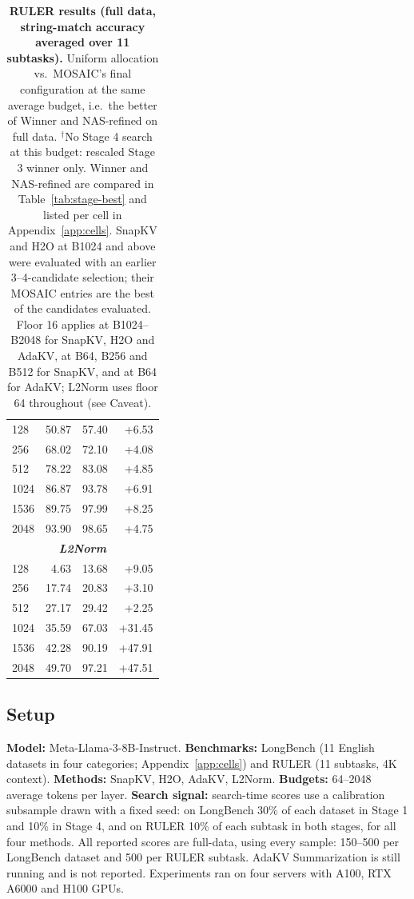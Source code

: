 \documentclass[11pt]{article}
\begin{document}
\begin{table}[t]
\begin{tabular}{@{} l r r r @{}}
    128 & 50.87 & 57.40 & +6.53 \\
    \rowcolor{gray!10}
    256 & 68.02 & 72.10 & +4.08 \\
    512 & 78.22 & 83.08 & +4.85 \\
    \rowcolor{gray!10}
    1024 & 86.87 & 93.78 & +6.91 \\
    1536 & 89.75 & 97.99 & +8.25 \\
    \rowcolor{gray!10}
    2048 & 93.90 & 98.65 & +4.75 \\
    \midrule
    \multicolumn{4}{c}{\textbf{\textit{L2Norm}}} \\
    \midrule
    \rowcolor{gray!10}
    128 & 4.63 & 13.68 & +9.05 \\
    256 & 17.74 & 20.83 & +3.10 \\
    \rowcolor{gray!10}
    512 & 27.17 & 29.42 & +2.25 \\
    1024 & 35.59 & 67.03 & +31.45 \\
    \rowcolor{gray!10}
    1536 & 42.28 & 90.19 & +47.91 \\
    2048 & 49.70 & 97.21 & +47.51 \\
    \bottomrule
  \end{tabular}
  \caption{\textbf{RULER results (full data, string-match accuracy averaged over 11 subtasks).} Uniform allocation vs.\ MOSAIC's final configuration at the same average budget, i.e.\ the better of Winner and NAS-refined on full data. $^\dagger$No Stage 4 search at this budget: rescaled Stage 3 winner only. Winner and NAS-refined are compared in Table~\ref{tab:stage-best} and listed per cell in Appendix~\ref{app:cells}. SnapKV and H2O at B1024 and above were evaluated with an earlier 3--4-candidate selection; their MOSAIC entries are the best of the candidates evaluated. Floor 16 applies at B1024--B2048 for SnapKV, H2O and AdaKV, at B64, B256 and B512 for SnapKV, and at B64 for AdaKV; L2Norm uses floor 64 throughout (see Caveat).}
  \label{tab:ruler-summary}
\end{table}


\subsection{Setup}

\textbf{Model:} Meta-Llama-3-8B-Instruct. \textbf{Benchmarks:} LongBench (11 English datasets in four categories; Appendix~\ref{app:cells}) and RULER (11 subtasks, 4K context). \textbf{Methods:} SnapKV, H2O, AdaKV, L2Norm. \textbf{Budgets:} 64–2048 average tokens per layer. \textbf{Search signal:} search-time scores use a calibration subsample drawn with a fixed seed: on LongBench 30\% of each dataset in Stage 1 and 10\% in Stage 4, and on RULER 10\% of each subtask in both stages, for all four methods. All reported scores are full-data, using every sample: 150–500 per LongBench dataset and 500 per RULER subtask. AdaKV Summarization is still running and is not reported. Experiments ran on four servers with A100, RTX A6000 and H100 GPUs.
\end{document}
